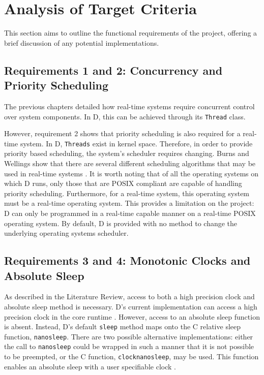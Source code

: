 \section{Analysis of Target Criteria} 
This section aims to outline the functional requirements of the project,
offering a brief discussion of any potential implementations.

\subsection{Requirements 1 and 2: Concurrency and Priority Scheduling} %
The previous chapters detailed how real-time systems require concurrent control
over system components. In D, this can be achieved through its \texttt{Thread} class. 
\par\bigskip\noindent
However, requirement 2 shows that priority scheduling is also required for a
real-time system. 
In D, \texttt{Threads} exist in kernel space. Therefore, in order to
provide priority based scheduling, the system's scheduler requires changing. Burns
and Wellings show that there are several different scheduling algorithms that
may be used in real-time systems \cite{real-time-systems}. It is worth noting
that of all the operating systems on which D runs, only those that are POSIX
compliant are capable of handling priority scheduling. Furthermore, for a
real-time system, this operating system must be a real-time operating system.
This provides a limitation on the project: D can only be programmed in a real-time
capable manner on a real-time POSIX operating system. 
By default, D is provided with no method to change the underlying operating
systems scheduler. 

\subsection{Requirements 3 and 4: Monotonic Clocks and Absolute Sleep} 
As described in the Literature Review, access to both a high precision
clock and absolute sleep method is necessary. D's
current implementation can access a high precision clock in the core runtime 
\cite{dlang-core-time}. However,
access to an absolute sleep function is absent. Instead, D's default
\texttt{sleep}
method maps onto the C relative sleep function, \texttt{nanosleep}. There are
two possible alternative implementations: either the call to
\texttt{nanosleep} could be wrapped in such a manner that it is not possible to be preempted, 
or the C function, \texttt{clock\textunderscore{}nanosleep}, may be used. This function enables 
an absolute sleep with a user specifiable clock \cite{clock-nanosleep}. 

